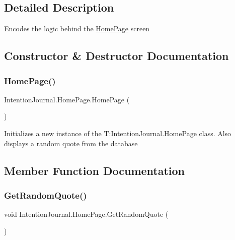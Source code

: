 \subsection{Detailed Description}
Encodes the logic behind the \hyperlink{class_intention_journal_1_1_home_page}{Home\+Page} screen 



\subsection{Constructor \& Destructor Documentation}
\mbox{\label{class_intention_journal_1_1_home_page_a69f39a8c0264f0a8fc82a2775a3a737a}} 
\subsubsection{\texorpdfstring{Home\+Page()}{HomePage()}}
{\footnotesize\ttfamily Intention\+Journal.\+Home\+Page.\+Home\+Page (\begin{DoxyParamCaption}{ }\end{DoxyParamCaption})\hspace{0.3cm}{\ttfamily [inline]}}



Initializes a new instance of the T\+:\+Intention\+Journal.\+Home\+Page class. Also displays a random quote from the database 



\subsection{Member Function Documentation}
\mbox{\label{class_intention_journal_1_1_home_page_a915b597ebcc642821b55a56090239816}} 
\subsubsection{\texorpdfstring{Get\+Random\+Quote()}{GetRandomQuote()}}
{\footnotesize\ttfamily void Intention\+Journal.\+Home\+Page.\+Get\+Random\+Quote (\begin{DoxyParamCaption}{ }\end{DoxyParamCaption})\hspace{0.3cm}{\ttfamily [inline]}}



